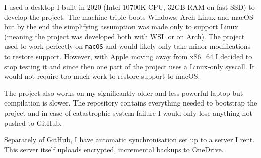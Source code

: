 I used a desktop I built in 2020 (Intel 10700K CPU, 32GB RAM on fast SSD) to develop the project.
The machine triple-boots Windows, Arch Linux and macOS but by the end the simplifying assumption
was made only to support Linux (meaning the project was developed both with WSL or on Arch). The
project used to work perfectly on \texttt{macOS} and would likely only take minor modifications to
restore support. However, with Apple moving away from x86\_64 I decided to stop testing it and
since
then one part of the project uses a Linux-only syscall. It would not require too much work to
restore support to macOS.

The project also works on my significantly older and less powerful laptop but compilation is
slower.
The repository contains everything needed to bootstrap the project and in case of catastrophic
system failure I would only lose anything not pushed to GitHub.

Separately of GitHub, I have automatic synchronisation set up to a server I rent. This server
itself
uploads encrypted, incremental backups to OneDrive.
